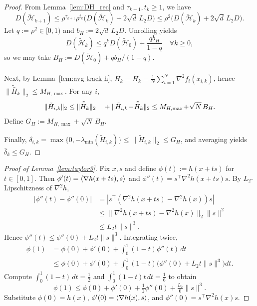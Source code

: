 \documentclass[review,onefignum,onetabnum]{siamart171218}
\begin{document}
\begin{proof}
From Lemma~\ref{lem:DH_rec} and $\tau_{k+1},t_k\ge 1$, we have
\[
D(\tilde{\mathcal H}_{k+1})
\le \rho^{\tau_{k+1}}\rho^{t_k}\Big(D(\tilde{\mathcal H}_k)+2\sqrt d\,L_2D\Big)
\le \rho^2\Big(D(\tilde{\mathcal H}_k)+2\sqrt d\,L_2D\Big).
\]
Let $q:=\rho^2\in[0,1)$ and $b_H:=2\sqrt d\,L_2D$. Unrolling yields
\[
D(\tilde{\mathcal H}_k)\le q^k D(\tilde{\mathcal H}_0)+\frac{qb_H}{1-q}\quad \forall k\ge 0,
\]
so we may take $B_H:=D(\tilde{\mathcal H}_0)+qb_H/(1-q)$.

Next, by Lemma~\ref{lem:avg-track-h},
$\tilde{\bar H}_k=\bar H_k=\frac1N\sum_{i=1}^N\nabla^2 f_i(x_{i,k})$,
hence $\|\tilde{\bar H}_k\|_2\le M_{H,\max}$.
For any $i$,
\[
\|\tilde H_{i,k}\|_2
\le \|\tilde{\bar H}_k\|_2\\
\quad + \|\tilde H_{i,k}\!-\!\tilde{\bar H}_k\|_2
\le M_{H,\max}\!+\!\sqrt{N}\,B_H.
\]
Define $G_H:=M_{H,\max} + \sqrt{N}\,B_H$.

Finally, $\delta_{i,k}=\max\{0,-\lambda_{\min}(\tilde H_{i,k})\}
\le \|\tilde H_{i,k}\|_2\le G_H$,
and averaging yields $\bar\delta_k\le G_H$.
\end{proof}

\begin{proof}[Proof of Lemma~\ref{lem:taylor3}]
Fix $x,s$ and define $\phi(t):=h(x+ts)$ for $t\in[0,1]$.
Then $\phi'(t)=\left\langle \nabla h(x+ts),s\right\rangle$ and $\phi''(t)=s^\top\nabla^2 h(x+ts)s$.
By $L_2$-Lipschitzness of $\nabla^2 h$,
\begin{align*}
|\phi''(t)\!-\!\phi''(0)|
&=|s^\top(\nabla^2 h(x\!+\!ts)\!-\!\nabla^2 h(x))s|\\
&\le \|\nabla^2 h(x\!+\!ts)\!-\!\nabla^2 h(x)\|_2\|s\|^2\\
&\le L_2 t\|s\|^3.
\end{align*}
Hence $\phi''(t)\le \phi''(0)+L_2 t\|s\|^3$.
Integrating twice,
\begin{align*}
\phi(1)&=\phi(0)+\phi'(0)+\int_0^1\!(1\!-\!t)\phi''(t)\,dt\\
&\le \phi(0)+\phi'(0)+\!\int_0^1\!(1\!-\!t)\big(\phi''(0)+L_2 t\|s\|^3\big)dt.
\end{align*}
Compute $\int_0^1(1-t)\,dt=\tfrac12$ and $\int_0^1(1-t)t\,dt=\tfrac16$ to obtain
\[
\phi(1)\le \phi(0)+\phi'(0)+\tfrac12\phi''(0)+\tfrac{L_2}{6}\|s\|^3.
\]
Substitute $\phi(0)=h(x)$, $\phi'(0)=\left\langle \nabla h(x),s\right\rangle$, and $\phi''(0)=s^\top\nabla^2 h(x)s$.
\end{proof}
\end{document}
